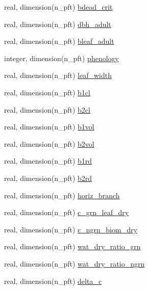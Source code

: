 \begin{DoxyCompactItemize}
real, dimension(n\+\_\+pft) \hyperlink{namespacepft__coms_a321291df889682b63b1a09ff1affff18}{bdead\+\_\+crit}
\item 
real, dimension(n\+\_\+pft) \hyperlink{namespacepft__coms_a5dbaccf1767dc343b4dca7f5e25f358b}{dbh\+\_\+adult}
\item 
real, dimension(n\+\_\+pft) \hyperlink{namespacepft__coms_a032c88698720a94f7bdeff271ae39844}{bleaf\+\_\+adult}
\item 
integer, dimension(n\+\_\+pft) \hyperlink{namespacepft__coms_a5a3bbf23e4825378c0f3c8bd788c6c68}{phenology}
\item 
real, dimension(n\+\_\+pft) \hyperlink{namespacepft__coms_ac9aba7609beabf8387afac8a12a89d5c}{leaf\+\_\+width}
\item 
real, dimension(n\+\_\+pft) \hyperlink{namespacepft__coms_ad31da22766c6db6bf3f24498eab8d22d}{b1cl}
\item 
real, dimension(n\+\_\+pft) \hyperlink{namespacepft__coms_a382f054406a23a234b101ebf06ff6d5c}{b2cl}
\item 
real, dimension(n\+\_\+pft) \hyperlink{namespacepft__coms_a44136dea8d02d3eba884e01b192a6895}{b1vol}
\item 
real, dimension(n\+\_\+pft) \hyperlink{namespacepft__coms_a54ac66449833305ba8a3c3415044856d}{b2vol}
\item 
real, dimension(n\+\_\+pft) \hyperlink{namespacepft__coms_a012ba0e0102bf2d9db7ef42b187326d5}{b1rd}
\item 
real, dimension(n\+\_\+pft) \hyperlink{namespacepft__coms_abfac20b7a9e8b92da039ecc3b59dfdc3}{b2rd}
\item 
real, dimension(n\+\_\+pft) \hyperlink{namespacepft__coms_a8727392237e76b0ac668b40267b5db14}{horiz\+\_\+branch}
\item 
real, dimension(n\+\_\+pft) \hyperlink{namespacepft__coms_a07a700fcd19f741c23db148885753d33}{c\+\_\+grn\+\_\+leaf\+\_\+dry}
\item 
real, dimension(n\+\_\+pft) \hyperlink{namespacepft__coms_a59778cca6e42ffcda34a2b44b31c0d80}{c\+\_\+ngrn\+\_\+biom\+\_\+dry}
\item 
real, dimension(n\+\_\+pft) \hyperlink{namespacepft__coms_a93b820778e953be06816231daa419ca5}{wat\+\_\+dry\+\_\+ratio\+\_\+grn}
\item 
real, dimension(n\+\_\+pft) \hyperlink{namespacepft__coms_a4228db82826a9e2afbe3646586c0c4ac}{wat\+\_\+dry\+\_\+ratio\+\_\+ngrn}
\item 
real, dimension(n\+\_\+pft) \hyperlink{namespacepft__coms_af5eccca1ecf526e4e6ece4c5e47d2bf8}{delta\+\_\+c}

\end{DoxyCompactItemize}
